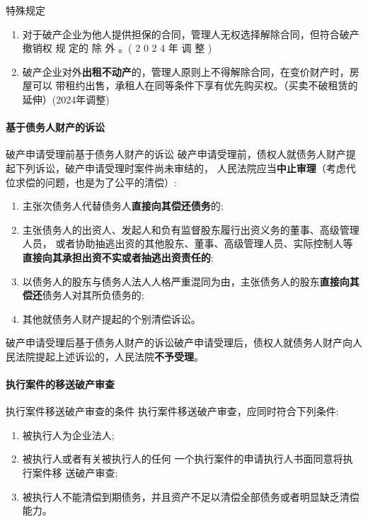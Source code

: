 \documentclass[UTF8,12pt]{ctexart}
\numberwithin{equation}{section} %
\numberwithin{figure}{section}
\numberwithin{table}{section}
\begin{document}
	特殊规定
	\begin{enumerate}
		\item 对于破产企业为他人提供担保的合同，管理人无权选择解除合同，但符合破产撤销权 规 定的 除 外 。( 2 0 2 4 年 调 整 )
		
		\item 破产企业对外\textbf{出租不动产}的，管理人原则上不得解除合同，在变价财产时，房屋可以 带租约出售，承租人在同等条件下享有优先购买权。（买卖不破租赁的延伸）(2024年调整)
	\end{enumerate}
	
	
	\paragraph{基于债务人财产的诉讼}
	破产申请受理前基于债务人财产的诉讼 破产申请受理前，债权人就债务人财产提起下列诉讼，破产申请受理时案件尚未审结的， 人民法院应当\textbf{中止审理}（考虑代位求偿的问题，也是为了公平的清偿）:
	\begin{enumerate}
		\item 主张次债务人代替债务人\textbf{直接向其偿还债务}的;
		
		\item 主张债务人的出资人、发起人和负有监督股东履行出资义务的董事、高级管理人员， 或者协助抽逃出资的其他股东、董事、高级管理人员、实际控制人等\textbf{直接向其承担出资不实或者抽逃出资责任的}; 
		
		\item 以债务人的股东与债务人法人人格严重混同为由，主张债务人的股东\textbf{直接向其偿还}债务人对其所负债务的;
		
		\item 其他就债务人财产提起的个别清偿诉讼。
	\end{enumerate}
	
	破产申请受理后基于债务人财产的诉讼破产申请受理后，债权人就债务人财产向人民法院提起上述诉讼的，人民法院\textbf{不予受理}。
	
	\paragraph{执行案件的移送破产审查}
	执行案件移送破产审查的条件 执行案件移送破产审查，应同时符合下列条件:
	\begin{enumerate}
		\item 被执行人为企业法人;
		
		\item 被执行人或者有关被执行人的任何 一个执行案件的申请执行人书面同意将执行案件移 送破产审查;
		
		\item 被执行人不能清偿到期债务，并且资产不足以清偿全部债务或者明显缺乏清偿能力。 
	\end{enumerate}
	
\end{document}

